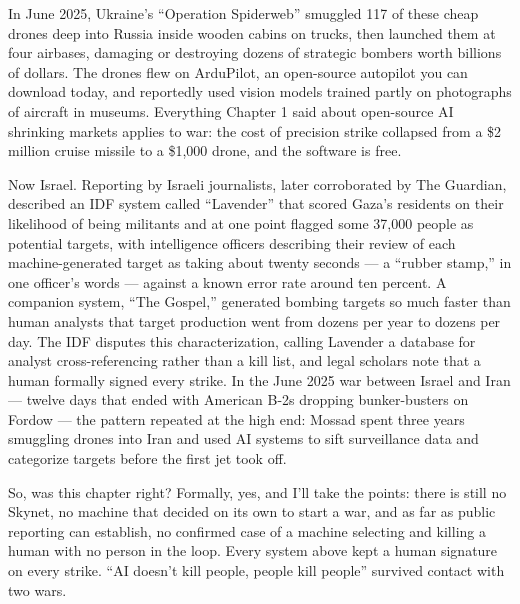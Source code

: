 In June 2025, Ukraine's ``Operation Spiderweb'' smuggled 117 of these cheap drones deep into Russia inside wooden cabins on trucks, then launched them at four airbases, damaging or destroying dozens of strategic bombers worth billions of dollars. The drones flew on ArduPilot, an open-source autopilot you can download today, and reportedly used vision models trained partly on photographs of aircraft in museums. Everything Chapter 1 said about open-source AI shrinking markets applies to war: the cost of precision strike collapsed from a \$2 million cruise missile to a \$1,000 drone, and the software is free.

Now Israel. Reporting by Israeli journalists, later corroborated by The Guardian, described an IDF system called ``Lavender'' that scored Gaza's residents on their likelihood of being militants and at one point flagged some 37,000 people as potential targets, with intelligence officers describing their review of each machine-generated target as taking about twenty seconds --- a ``rubber stamp,'' in one officer's words --- against a known error rate around ten percent. A companion system, ``The Gospel,'' generated bombing targets so much faster than human analysts that target production went from dozens per year to dozens per day. The IDF disputes this characterization, calling Lavender a database for analyst cross-referencing rather than a kill list, and legal scholars note that a human formally signed every strike. In the June 2025 war between Israel and Iran --- twelve days that ended with American B-2s dropping bunker-busters on Fordow --- the pattern repeated at the high end: Mossad spent three years smuggling drones into Iran and used AI systems to sift surveillance data and categorize targets before the first jet took off.

So, was this chapter right? Formally, yes, and I'll take the points: there is still no Skynet, no machine that decided on its own to start a war, and as far as public reporting can establish, no confirmed case of a machine selecting and killing a human with no person in the loop. Every system above kept a human signature on every strike. ``AI doesn't kill people, people kill people'' survived contact with two wars.

